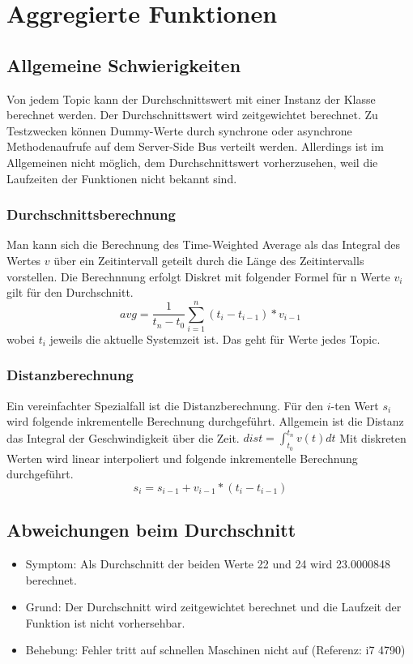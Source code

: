 \documentclass[qualitaetssicherung.tex]{subfiles}
\begin{document}
\section{Aggregierte Funktionen}

	\subsection*{Allgemeine Schwierigkeiten} 
		Von jedem Topic kann der Durchschnittswert mit einer Instanz der Klasse  berechnet werden. Der Durchschnittswert wird zeitgewichtet berechnet. Zu Testzwecken können Dummy-Werte durch synchrone oder asynchrone Methodenaufrufe auf dem Server-Side Bus verteilt werden. Allerdings ist im Allgemeinen nicht möglich, dem Durchschnittswert vorherzusehen, weil die Laufzeiten der Funktionen nicht bekannt sind.

		\subsubsection{Durchschnittsberechnung} 
		Man kann sich die Berechnung des Time-Weighted Average als das Integral des Wertes $v$ über ein Zeitintervall geteilt durch die Länge des Zeitintervalls vorstellen. Die Berechnnung erfolgt Diskret mit folgender Formel für n Werte $v_i$ gilt für den Durchschnitt.
		\begin{equation} \label{EQAVG}
			avg = \frac{1}{t_n - t_0} \sum_{i = 1}^{n} (t_i - t_{i-1}) * v_{i-1}
		\end{equation}
		 wobei $t_i$ jeweils die aktuelle Systemzeit ist. Das geht für Werte jedes Topic.

		\subsubsection{Distanzberechnung} 
		Ein vereinfachter Spezialfall ist die Distanzberechnung. Für den $i$-ten Wert $s_i$ wird folgende inkrementelle Berechnung durchgeführt. Allgemein ist die Distanz das Integral der Geschwindigkeit über die Zeit. $dist = \int_{t_0}^{t_n} v(t) dt$ Mit diskreten Werten wird linear interpoliert und folgende inkrementelle Berechnung durchgeführt.
		 \begin{equation} \label{EQDIST}
		 	s_{i} = s_{i-1} + v_{i-1} * (t_i - t_{i-1})	
		 \end{equation}





	\subsection{Abweichungen beim Durchschnitt} \label{DAVG}
		\begin{itemize}
			\item
			Symptom: Als Durchschnitt der beiden Werte 22 und 24 wird 23.0000848 berechnet.
			\item
			Grund: Der Durchschnitt wird zeitgewichtet berechnet und die Laufzeit der Funktion ist nicht vorhersehbar.
			\item
			Behebung: Fehler tritt auf schnellen Maschinen nicht auf (Referenz: i7 4790)

		\end{itemize}
\end{document}
